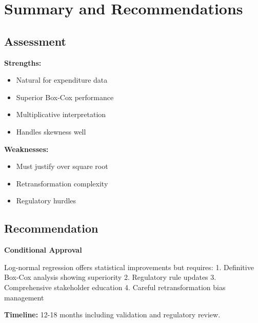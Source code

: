 \section{Summary and Recommendations}

\subsection{Assessment}

\textbf{Strengths:}
\begin{itemize}
    \item Natural for expenditure data
    \item Superior Box-Cox performance
    \item Multiplicative interpretation
    \item Handles skewness well
\end{itemize}

\textbf{Weaknesses:}
\begin{itemize}
    \item Must justify over square root
    \item Retransformation complexity
    \item Regulatory hurdles
\end{itemize}

\subsection{Recommendation}

\textbf{Conditional Approval}

Log-normal regression offers statistical improvements but requires:
1. Definitive Box-Cox analysis showing superiority
2. Regulatory rule updates
3. Comprehensive stakeholder education
4. Careful retransformation bias management

\textbf{Timeline:} 12-18 months including validation and regulatory review.
